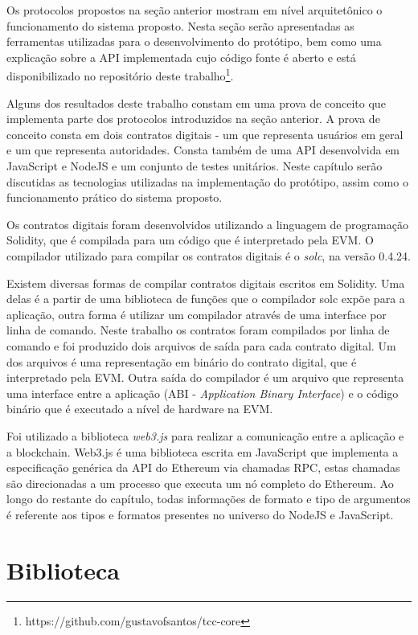 \documentclass[tcc,capa]{texufpel}
\begin{document}
    Os protocolos propostos na seção anterior mostram em nível arquitetônico o funcionamento do sistema proposto. Nesta seção serão apresentadas as ferramentas utilizadas para o desenvolvimento do protótipo, bem como uma explicação sobre a API implementada cujo código fonte é aberto e está disponibilizado no repositório deste trabalho\footnote{https://github.com/gustavofsantos/tcc-core}.
    
    Alguns dos resultados deste trabalho constam em uma prova de conceito que implementa parte dos protocolos introduzidos na seção anterior. A prova de conceito consta em dois contratos digitais - um que representa usuários em geral e um que representa autoridades. Consta também de uma API desenvolvida em JavaScript e NodeJS e um conjunto de testes unitários. Neste capítulo serão discutidas as tecnologias utilizadas na implementação do protótipo, assim como o funcionamento prático do sistema proposto.
    
    Os contratos digitais foram desenvolvidos utilizando a linguagem de programação Solidity, que é compilada para um código que é interpretado pela EVM. O compilador utilizado para compilar os contratos digitais é o \textit{solc}, na versão 0.4.24. 
    
    Existem diversas formas de compilar contratos digitais escritos em Solidity. Uma delas é a partir de uma biblioteca de funções que o compilador solc expõe para a aplicação, outra forma é utilizar um compilador através de uma interface por linha de comando. Neste trabalho os contratos foram compilados por linha de comando e foi produzido dois arquivos de saída para cada contrato digital. Um dos arquivos é uma representação em binário do contrato digital, que é interpretado pela EVM. Outra saída do compilador é um arquivo que representa uma interface entre a aplicação (ABI - \textit{Application Binary Interface}) e o código binário que é executado a nível de hardware na EVM.
    
    Foi utilizado a biblioteca \textit{web3.js} para realizar a comunicação entre a aplicação e a blockchain. Web3.js é uma biblioteca escrita em JavaScript que implementa a especificação genérica da API do Ethereum via chamadas RPC, estas chamadas são direcionadas a um processo que executa um nó completo do Ethereum. Ao longo do restante do capítulo, todas informações de formato e tipo de argumentos é referente aos tipos e formatos presentes no universo do NodeJS e JavaScript.
    
    \section{Biblioteca}
    
\end{document}

